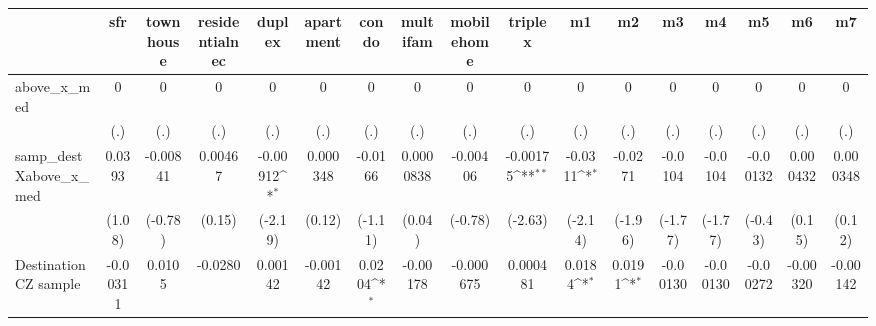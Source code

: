\begin{table}[htbp]\centering
\def\sym#1{\ifmmode^{#1}\else\(^{#1}\)\fi}
\caption{ \label{tab1}}
\begin{tabular}{l*{16}{c}}
\toprule
                    &\multicolumn{1}{c}{sfr}&\multicolumn{1}{c}{townhouse}&\multicolumn{1}{c}{residentialnec}&\multicolumn{1}{c}{duplex}&\multicolumn{1}{c}{apartment}&\multicolumn{1}{c}{condo}&\multicolumn{1}{c}{multifam}&\multicolumn{1}{c}{mobilehome}&\multicolumn{1}{c}{triplex}&\multicolumn{1}{c}{m1}&\multicolumn{1}{c}{m2}&\multicolumn{1}{c}{m3}&\multicolumn{1}{c}{m4}&\multicolumn{1}{c}{m5}&\multicolumn{1}{c}{m6}&\multicolumn{1}{c}{m7}\\
\midrule
above\_x\_med         &           0         &           0         &           0         &           0         &           0         &           0         &           0         &           0         &           0         &           0         &           0         &           0         &           0         &           0         &           0         &           0         \\
                    &         (.)         &         (.)         &         (.)         &         (.)         &         (.)         &         (.)         &         (.)         &         (.)         &         (.)         &         (.)         &         (.)         &         (.)         &         (.)         &         (.)         &         (.)         &         (.)         \\
\addlinespace
samp\_destXabove\_x\_med&      0.0393         &    -0.00841         &     0.00467         &    -0.00912\sym{*}  &    0.000348         &     -0.0166         &   0.0000838         &    -0.00406         &    -0.00175\sym{**} &     -0.0311\sym{*}  &     -0.0271         &     -0.0104         &     -0.0104         &    -0.00132         &    0.000432         &    0.000348         \\
                    &      (1.08)         &     (-0.78)         &      (0.15)         &     (-2.19)         &      (0.12)         &     (-1.11)         &      (0.04)         &     (-0.78)         &     (-2.63)         &     (-2.14)         &     (-1.96)         &     (-1.77)         &     (-1.77)         &     (-0.43)         &      (0.15)         &      (0.12)         \\
\addlinespace
Destination CZ sample&    -0.00311         &      0.0105         &     -0.0280         &     0.00142         &    -0.00142         &      0.0204\sym{*}  &    -0.00178         &   -0.000675         &    0.000481         &      0.0184\sym{*}  &      0.0191\sym{*}  &    -0.00130         &    -0.00130         &    -0.00272         &    -0.00320         &    -0.00142         \\

\end{tabular}
\end{table}
